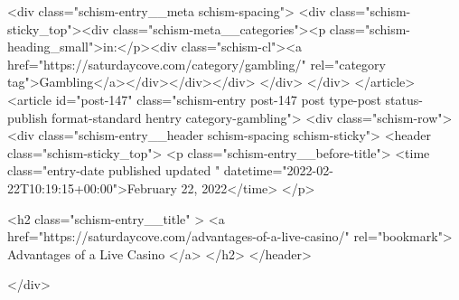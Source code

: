 {		<div class="schism-entry__meta schism-spacing">			<div class="schism-sticky_top"><div class="schism-meta__categories"><p class="schism-heading_small">in:</p><div class="schism-cl"><a href="https://saturdaycove.com/category/gambling/" rel="category tag">Gambling</a></div></div></div>		</div>
	</div>
</article>
<article id="post-147" class="schism-entry post-147 post type-post status-publish format-standard hentry category-gambling">
	<div class="schism-row">		<div class="schism-entry__header schism-spacing schism-sticky">			<header class="schism-sticky_top">				<p class="schism-entry__before-title">
					<time class="entry-date published updated " datetime="2022-02-22T10:19:15+00:00">February 22, 2022</time>				</p>

				<h2 class="schism-entry__title" >
					<a href="https://saturdaycove.com/advantages-of-a-live-casino/" rel="bookmark">
						Advantages of a Live Casino					</a>
				</h2>
			</header>

					</div>

}
